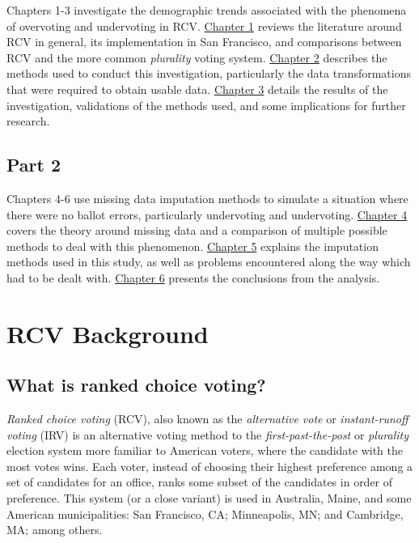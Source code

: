 \documentclass[12pt,twoside]{reedthesis}
\begin{document}
Chapters 1-3 investigate the demographic trends associated with the phenomena of overvoting and undervoting in RCV.
\protect\hyperlink{demo-litreview}{Chapter 1} reviews the literature around RCV in general, its implementation in San Francisco, and comparisons between RCV and the more common \emph{plurality} voting system.
\protect\hyperlink{demo-methods}{Chapter 2} describes the methods used to conduct this investigation, particularly the data transformations that were required to obtain usable data.
\protect\hyperlink{demo-results}{Chapter 3} details the results of the investigation, validations of the methods used, and some implications for further research.

\hypertarget{part-2}{%
\section*{Part 2}\label{part-2}}

Chapters 4-6 use missing data imputation methods to simulate a situation where there were no ballot errors, particularly undervoting and undervoting.
\protect\hyperlink{missing-litreview}{Chapter 4} covers the theory around missing data and a comparison of multiple possible methods to deal with this phenomenon.
\protect\hyperlink{missing-methods}{Chapter 5} explains the imputation methods used in this study, as well as problems encountered along the way which had to be dealt with.
\protect\hyperlink{missing-results}{Chapter 6} presents the conclusions from the analysis.

\hypertarget{demo-litreview}{%
\chapter{RCV Background}\label{demo-litreview}}

\hypertarget{what-is-ranked-choice-voting}{%
\section{What is ranked choice voting?}\label{what-is-ranked-choice-voting}}

\emph{Ranked choice voting} (RCV), also known as the \emph{alternative vote} or \emph{instant-runoff voting} (IRV) is an alternative voting method to the \emph{first-past-the-post} or \emph{plurality} election system more familiar to American voters, where the candidate with the most votes wins. Each voter, instead of choosing their highest preference among a set of candidates for an office, ranks some subset of the candidates in order of preference. This system (or a close variant) is used in Australia, Maine, and some American municipalities: San Francisco, CA; Minneapolis, MN; and Cambridge, MA; among others.
\end{document}
